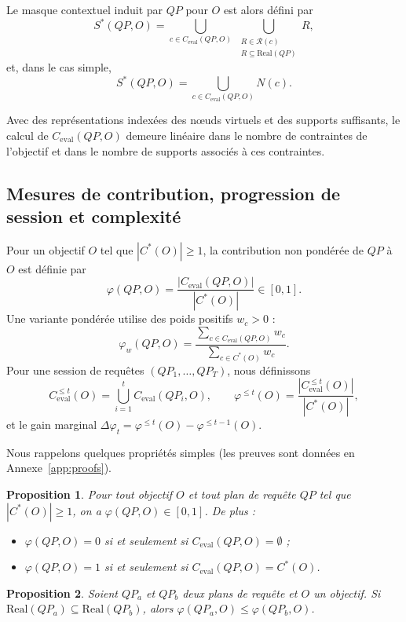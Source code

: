 \documentclass[journal]{IEEEtran}
\newtheorem{proposition}{Proposition}
\begin{document}
Le masque contextuel induit par $QP$ pour $O$ est alors défini par
\[
S^*(QP,O)=\bigcup_{c\in C_{\mathrm{eval}}(QP,O)} \ \bigcup_{\substack{R\in \mathcal{R}(c)\\R\subseteq \mathrm{Real}(QP)}} R,
\]
et, dans le cas simple,
\[
S^*(QP,O)=\bigcup_{c\in C_{\mathrm{eval}}(QP,O)} N(c).
\]

Avec des représentations indexées des nœuds virtuels et des supports suffisants, le calcul de $C_{\mathrm{eval}}(QP,O)$ demeure linéaire dans le nombre de contraintes de l'objectif et dans le nombre de supports associés à ces contraintes.

\subsection{Mesures de contribution, progression de session et complexité}

Pour un objectif $O$ tel que $|C^*(O)|\ge 1$, la contribution non pondérée de $QP$ à $O$ est définie par
\[
\varphi(QP,O)=\frac{|C_{\mathrm{eval}}(QP,O)|}{|C^*(O)|}\in[0,1].
\]
Une variante pondérée utilise des poids positifs $w_c>0$ :
\[
\varphi_w(QP,O)=\frac{\sum_{c\in C_{\mathrm{eval}}(QP,O)} w_c}{\sum_{c\in C^*(O)} w_c}.
\]
Pour une session de requêtes $(QP_1,\dots,QP_T)$, nous définissons
\[
C_{\mathrm{eval}}^{\le t}(O)=\bigcup_{i=1}^{t} C_{\mathrm{eval}}(QP_i,O),\qquad
\varphi^{\le t}(O)=\frac{|C_{\mathrm{eval}}^{\le t}(O)|}{|C^*(O)|},
\]
et le gain marginal $\Delta\varphi_t=\varphi^{\le t}(O)-\varphi^{\le t-1}(O)$.

Nous rappelons quelques propriétés simples (les preuves sont données en Annexe~\ref{app:proofs}).

\begin{proposition}
\label{prop:borne}
Pour tout objectif $O$ et tout plan de requête $QP$ tel que $|C^*(O)|\ge 1$, on a $\varphi(QP,O)\in[0,1]$. De plus :
\begin{itemize}
  \item $\varphi(QP,O)=0$ si et seulement si $C_{\mathrm{eval}}(QP,O)=\emptyset$ ;
  \item $\varphi(QP,O)=1$ si et seulement si $C_{\mathrm{eval}}(QP,O)=C^*(O)$.
\end{itemize}
\end{proposition}

\begin{proposition}
\label{prop:mono-real}
Soient $QP_a$ et $QP_b$ deux plans de requête et $O$ un objectif. Si $\mathrm{Real}(QP_a)\subseteq \mathrm{Real}(QP_b)$, alors $\varphi(QP_a,O)\le \varphi(QP_b,O)$.
\end{proposition}
\end{document}
